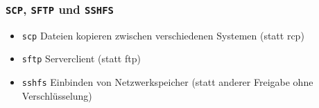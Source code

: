\begin{frame}
\frametitle{\texttt{SCP}, \texttt{SFTP} und \texttt{SSHFS}}
\begin{itemize}
\item \texttt{scp} Dateien kopieren zwischen verschiedenen Systemen (statt rcp)
\pause
\item \texttt{sftp} Serverclient (statt ftp)
\pause
\item \texttt{sshfs} Einbinden von Netzwerkspeicher (statt anderer Freigabe ohne Verschlüsselung)
\end{itemize}
\end{frame}